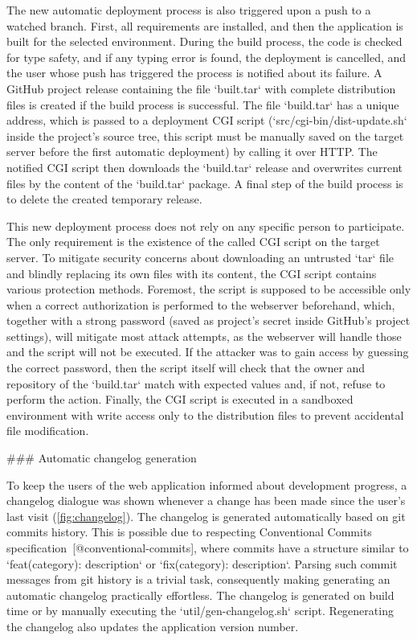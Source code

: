 \documentclass[
  digital, %
  oneside, %
  lof,     %
  nolot,     %
]{fithesis4}
\begin{document}
{The new automatic deployment process is also triggered upon a push to a watched branch. First, all requirements are installed, and then the application is built for the selected environment. During the build process, the code is checked for type safety, and if any typing error is found, the deployment is cancelled, and the user whose push has triggered the process is notified about its failure. A GitHub project release containing the file `built.tar` with complete distribution files is created if the build process is successful. The file `build.tar` has a unique address, which is passed to a deployment CGI script (`src/cgi-bin/dist-update.sh` inside the project's source tree, this script must be manually saved on the target server before the first automatic deployment) by calling it over HTTP. The notified CGI script then downloads the `build.tar` release and overwrites current files by the content of the `build.tar` package. A final step of the build process is to delete the created temporary release.

This new deployment process does not rely on any specific person to participate. The only requirement is the existence of the called CGI script on the target server. To mitigate security concerns about downloading an untrusted `tar` file and blindly replacing its own files with its content, the CGI script contains various protection methods. Foremost, the script is supposed to be accessible only when a correct authorization is performed to the webserver beforehand, which, together with a strong password (saved as project's secret inside GitHub's project settings), will mitigate most attack attempts, as the webserver will handle those and the script will not be executed. If the attacker was to gain access by guessing the correct password, then the script itself will check that the owner and repository of the `build.tar` match with expected values and, if not, refuse to perform the action. Finally, the CGI script is executed in a sandboxed environment with write access only to the distribution files to prevent accidental file modification.

### Automatic changelog generation
\label{chap:changelog}

To keep the users of the web application informed about development progress, a changelog dialogue was shown whenever a change has been made since the user's last visit (\autoref{fig:changelog}). The changelog is generated automatically based on git commits history. This is possible due to respecting Conventional Commits specification~[@conventional-commits], where commits have a structure similar to `feat(category): description` or `fix(category): description`. Parsing such commit messages from git history is a trivial task, consequently making generating an automatic changelog practically effortless. The changelog is generated on build time or by manually executing the `util/gen-changelog.sh` script. Regenerating the changelog also updates the application version number.

}
\end{document}
